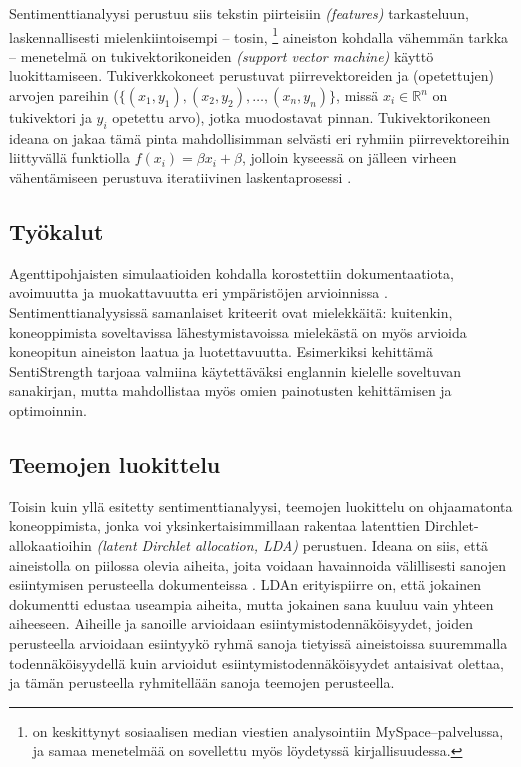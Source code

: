 \documentclass[finnish,gradu,twoside,12pt]{tktltiki}
\begin{document}
{Sentimenttianalyysi perustuu siis tekstin piirteisiin \textit{(features)} tarkasteluun, laskennallisesti mielenkiintoisempi -- tosin, \citet{Thelwall2010}\footnote{\citet{Thelwall2010} on keskittynyt sosiaalisen median viestien analysointiin MySpace--palvelussa, ja samaa menetelmää on sovellettu myös löydetyssä kirjallisuudessa.} aineiston kohdalla vähemmän tarkka -- menetelmä on tukivektorikoneiden \textit{(support vector machine)} käyttö luokittamiseen. Tukiverkkokoneet perustuvat piirrevektoreiden ja (opetettujen) arvojen pareihin ($\{ (x_1, y_1), (x_2, y_2), \ldots, (x_n, y_n) \}$, missä $x_i \in \mathbb{R}^n$ on tukivektori ja $y_i$ opetettu arvo), jotka muodostavat pinnan. Tukivektorikoneen ideana on jakaa tämä pinta mahdollisimman selvästi eri ryhmiin piirrevektoreihin liittyvällä funktiolla $f(x_i) = \beta x_i + \beta$, jolloin kyseessä on jälleen virheen vähentämiseen perustuva iteratiivinen laskentaprosessi \citep{Hastie2009}.

\subsection*{Työkalut}

Agenttipohjaisten simulaatioiden kohdalla korostettiin dokumentaatiota, avoimuutta ja muokattavuutta eri ympäristöjen arvioinnissa \citep{Tobias2004}. Sentimenttianalyysissä samanlaiset kriteerit ovat mielekkäitä: kuitenkin, koneoppimista soveltavissa lähestymistavoissa mielekästä on myös arvioida koneopitun aineiston laatua ja luotettavuutta. Esimerkiksi \citet{Thelwall2010} kehittämä SentiStrength tarjoaa valmiina käytettäväksi englannin kielelle soveltuvan sanakirjan, mutta mahdollistaa myös omien painotusten kehittämisen ja optimoinnin.

\subsection{Teemojen luokittelu}

Toisin kuin yllä esitetty sentimenttianalyysi, teemojen luokittelu on ohjaamatonta koneoppimista, jonka voi yksinkertaisimmillaan rakentaa latenttien Dirchlet-allokaatioihin \textit{(latent Dirchlet allocation, LDA)} perustuen. Ideana on siis, että aineistolla on piilossa olevia aiheita, joita voidaan havainnoida välillisesti sanojen esiintymisen perusteella dokumenteissa \citep{Blei2010,Blei2003}. LDAn erityispiirre on, että jokainen dokumentti edustaa useampia aiheita, mutta jokainen sana kuuluu vain yhteen aiheeseen. Aiheille ja sanoille arvioidaan esiintymistodennäköisyydet, joiden perusteella arvioidaan esiintyykö ryhmä sanoja tietyissä aineistoissa suuremmalla todennäköisyydellä kuin arvioidut esiintymistodennäköisyydet antaisivat olettaa, ja tämän perusteella ryhmitellään sanoja teemojen perusteella.

}
\end{document}
